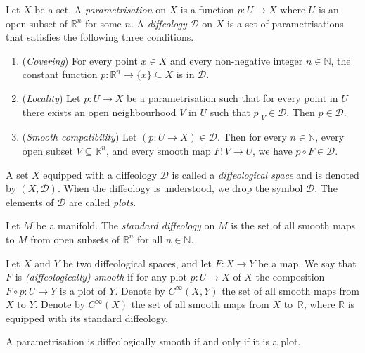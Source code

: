 \documentclass[pdftex]{sigma}
\numberwithin{equation}{section}
\newcommand{\NN}{{\mathbb{N}}} %
\newcommand{\RR}{{\mathbb{R}}} %
\newcommand{\CIN}{{C^\infty}} %
\def \calD {{\mathcal{D}}}
\begin{document}
\begin{Definition}
Let $X$ be a set. A \emph{parametrisation} on $X$ is a
function $p \colon U \to X$ where $U$ is an open subset of $\RR^n$
for some $n$.
A \emph{diffeology} $\mathcal{D}$ on $X$ is a set of parametrisations
that satisf\/ies the following three conditions.

\begin{enumerate}\itemsep=0pt
\item (\emph{Covering})
For every point $x \in X$ and every non-negative integer $n \in \NN$,
the constant function $p \colon \RR^n \to \{ x \} \subseteq X$
is in $\mathcal{D}$.
\item (\emph{Locality})
Let $p \colon U \to X$ be a parametrisation such that
for every point in $U$ there exists an open neighbourhood $V$ in $U$
such that $p|_V \in \mathcal{D}$. Then $p\in\mathcal{D}$.
\item (\emph{Smooth compatibility})
Let $(p \colon U\to X) \in \mathcal{D}$.
Then for every $n \in \NN$, every open subset $V \subseteq \RR^n$,
and every smooth map $F \colon V \to U$, we have $p \circ F \in \mathcal{D}$.
\end{enumerate}

A set $X$ equipped with a dif\/feology $\mathcal{D}$ is called
a \emph{diffeological space} and is denoted by $(X,\mathcal{D})$.
When the dif\/feology is understood, we drop the symbol $\mathcal{D}$.
The elements of $\calD$ are called \emph{plots}.
\end{Definition}

\begin{Example}
Let $M$ be a manifold. The \emph{standard diffeology} on $M$ is the
set of all smooth maps to $M$ from open subsets of $\RR^n$
for all $n \in \NN$.
\end{Example}

\begin{Definition}
Let $X$ and $Y$ be two dif\/feological spaces,
and let $F \colon X\to Y$ be a map. We say that $F$ is
\emph{(diffeologically) smooth} if for any plot $p \colon U \to X$ of $X$
the composition $ F \circ p \colon U \to Y$ is a plot of $Y$.
Denote by $\CIN(X,Y)$ the set of all smooth maps
from $X$ to $Y$.
Denote by $\CIN(X)$ the set of all smooth maps from $X$ to~$\RR$,
where $\RR$ is equipped with its standard dif\/feology.
\end{Definition}

\begin{Remark}[plots]
A parametrisation is dif\/feologically smooth if and only if it is a plot.
\end{Remark}
\end{document}
